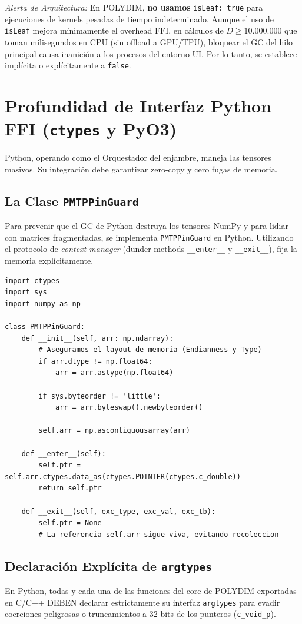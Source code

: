 \emph{Alerta de Arquitectura:} En POLYDIM, \textbf{no usamos} \texttt{isLeaf: true} para ejecuciones de kernels pesadas de tiempo indeterminado. Aunque el uso de \texttt{isLeaf} mejora mínimamente el overhead FFI, en cálculos de $D \ge 10.000.000$ que toman milisegundos en CPU (sin offload a GPU/TPU), bloquear el GC del hilo principal causa inanición a los procesos del entorno UI. Por lo tanto, se establece implícita o explícitamente a \texttt{false}.

\section{Profundidad de Interfaz Python FFI (\texttt{ctypes} y PyO3)}

Python, operando como el Orquestador del enjambre, maneja las tensores masivos. Su integración debe garantizar zero-copy y cero fugas de memoria.

\subsection{La Clase \texttt{PMTPPinGuard}}
Para prevenir que el GC de Python destruya los tensores NumPy y para lidiar con matrices fragmentadas, se implementa \texttt{PMTPPinGuard} en Python. Utilizando el protocolo de \emph{context manager} (dunder methods \texttt{\_\_enter\_\_} y \texttt{\_\_exit\_\_}), fija la memoria explícitamente.

\begin{verbatim}
import ctypes
import sys
import numpy as np

class PMTPPinGuard:
    def __init__(self, arr: np.ndarray):
        # Aseguramos el layout de memoria (Endianness y Type)
        if arr.dtype != np.float64:
            arr = arr.astype(np.float64)
            
        if sys.byteorder != 'little':
            arr = arr.byteswap().newbyteorder()
            
        self.arr = np.ascontiguousarray(arr)
        
    def __enter__(self):
        self.ptr = self.arr.ctypes.data_as(ctypes.POINTER(ctypes.c_double))
        return self.ptr
        
    def __exit__(self, exc_type, exc_val, exc_tb):
        self.ptr = None
        # La referencia self.arr sigue viva, evitando recoleccion
\end{verbatim}

\subsection{Declaración Explícita de \texttt{argtypes}}
En Python, todas y cada una de las funciones del core de POLYDIM exportadas en C/C++ DEBEN declarar estrictamente su interfaz \texttt{argtypes} para evadir coerciones peligrosas o truncamientos a 32-bits de los punteros (\texttt{c\_void\_p}).

